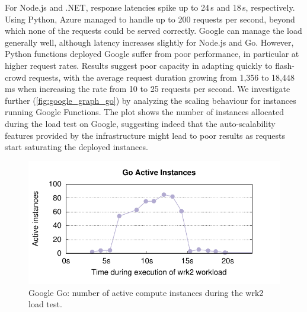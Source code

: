For Node.js and .NET, response latencies spike up to 24\,s and 18\,s, respectively. %
Using Python, Azure managed to handle up to 200 requests per second, beyond which none of the requests could be served correctly.
Google can manage the load generally well, although latency increases slightly for Node.js and Go. 
However, Python functions deployed Google suffer from poor performance, in particular at higher request rates. 
Results suggest poor capacity in adapting quickly to flash-crowd requests, with the average request duration growing from 1,356 to 18,448\,ms when increasing the rate from 10 to 25 requests per second. 
We investigate further (\autoref{fig:google_graph_go}) by analyzing the scaling behaviour for instances running Google Functions.
The plot shows the number of instances allocated during the load test on Google, suggesting indeed that the auto-scalability features provided by the infrastructure might lead to poor results as requests start saturating the deployed instances.

\begin{figure}[!t]
\centering
\includegraphics[scale=0.7]{bilder/go_instances/go_instances.pdf}
\caption{Google Go: number of active compute instances during the wrk2 load test.}
\label{fig:google_graph_go}
\end{figure}

